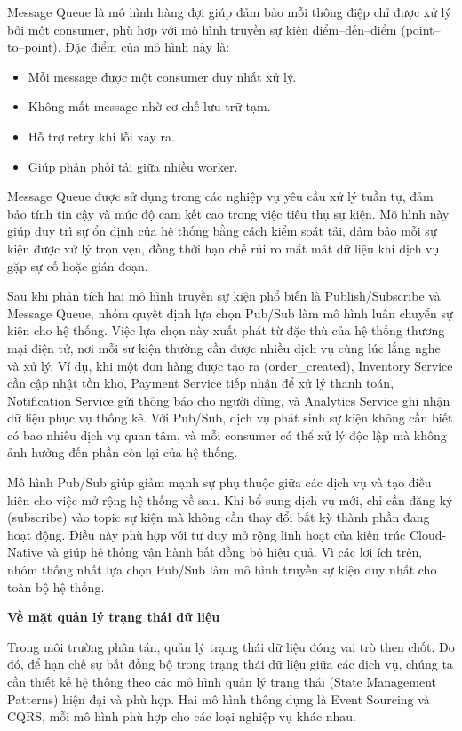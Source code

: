 Message Queue là mô hình hàng đợi giúp đảm bảo mỗi thông điệp chỉ được xử lý bởi một consumer, phù hợp với mô hình truyền sự kiện điểm--đến--điểm (point--to--point). Đặc điểm của mô hình này là:
\begin{itemize}
    \item Mỗi message được một consumer duy nhất xử lý\cite{c4-eda}.
    \item Không mất message nhờ cơ chế lưu trữ tạm.
    \item Hỗ trợ retry khi lỗi xảy ra.
    \item Giúp phân phối tải giữa nhiều worker.
\end{itemize}
Message Queue được sử dụng trong các nghiệp vụ yêu cầu xử lý tuần tự, đảm bảo tính tin cậy và mức độ cam kết cao trong việc tiêu thụ sự kiện. Mô hình này giúp duy trì sự ổn định của hệ thống bằng cách kiểm soát tải, đảm bảo mỗi sự kiện được xử lý trọn vẹn, đồng thời hạn chế rủi ro mất mát dữ liệu khi dịch vụ gặp sự cố hoặc gián đoạn.

Sau khi phân tích hai mô hình truyền sự kiện phổ biến là Publish/Subscribe và Message Queue, nhóm quyết định lựa chọn Pub/Sub làm mô hình luân chuyển sự kiện cho hệ thống. Việc lựa chọn này xuất phát từ đặc thù của hệ thống thương mại điện tử, nơi mỗi sự kiện thường cần được nhiều dịch vụ cùng lúc lắng nghe và xử lý. Ví dụ, khi một đơn hàng được tạo ra (order\_created), Inventory Service cần cập nhật tồn kho, Payment Service tiếp nhận để xử lý thanh toán, Notification Service gửi thông báo cho người dùng, và Analytics Service ghi nhận dữ liệu phục vụ thống kê. Với Pub/Sub, dịch vụ phát sinh sự kiện không cần biết có bao nhiêu dịch vụ quan tâm, và mỗi consumer có thể xử lý độc lập mà không ảnh hưởng đến phần còn lại của hệ thống.

Mô hình Pub/Sub giúp giảm mạnh sự phụ thuộc giữa các dịch vụ và tạo điều kiện cho việc mở rộng hệ thống về sau. Khi bổ sung dịch vụ mới, chỉ cần đăng ký (subscribe) vào topic sự kiện mà không cần thay đổi bất kỳ thành phần đang hoạt động. Điều này phù hợp với tư duy mở rộng linh hoạt của kiến trúc Cloud-Native và giúp hệ thống vận hành bất đồng bộ hiệu quả. Vì các lợi ích trên, nhóm thống nhất lựa chọn Pub/Sub làm mô hình truyền sự kiện duy nhất cho toàn bộ hệ thống.
\bigskip






\textbf{Về mặt quản lý trạng thái dữ liệu}

Trong môi trường phân tán, quản lý trạng thái dữ liệu đóng vai trò then chốt. Do đó, để hạn chế sự bất đồng bộ trong trạng thái dữ liệu giữa các dịch vụ, chúng ta cần thiết kế hệ thống theo các mô hình quản lý trạng thái (State Management Patterns) hiện đại và phù hợp. Hai mô hình thông dụng là Event Sourcing và CQRS, mỗi mô hình phù hợp cho các loại nghiệp vụ khác nhau.


